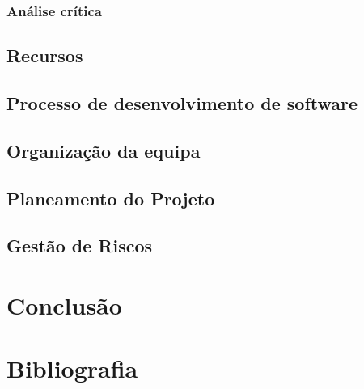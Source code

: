 \documentclass[a4paper]{report}
\begin{document}
\subsection{Análise crítica}
\section{Recursos}
\section{Processo de desenvolvimento de software}
\section{Organização da equipa}
\section{Planeamento do Projeto}
\section{Gestão de Riscos}
\chapter{Conclusão}
\chapter{Bibliografia }
\end{document}
